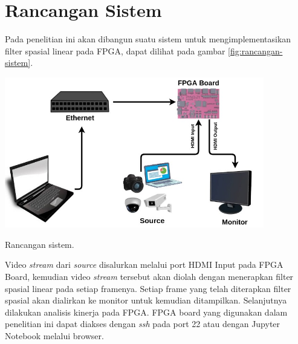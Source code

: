 \section{Rancangan Sistem}
Pada penelitian ini akan dibangun suatu sistem untuk mengimplementasikan filter spasial linear pada FPGA, dapat dilihat pada gambar \ref{fig:rancangan-sistem}.
\begin{afigure}
    \includegraphics[width=0.85\textwidth, center]{images/rancangan-sistem.jpg}
    \caption{Rancangan sistem.}
    \label{fig:rancangan-sistem}
\end{afigure}

Video \textit{stream} dari \textit{source} disalurkan melalui port HDMI Input pada FPGA Board, kemudian video \textit{stream} tersebut akan diolah dengan menerapkan filter spasial linear pada setiap framenya. Setiap frame yang telah diterapkan filter spasial akan dialirkan ke monitor untuk kemudian ditampilkan. Selanjutnya dilakukan analisis kinerja pada FPGA. FPGA board yang digunakan dalam penelitian ini dapat diakses dengan \textit{ssh} pada port 22 atau dengan Jupyter Notebook melalui browser.

\pagebreak

